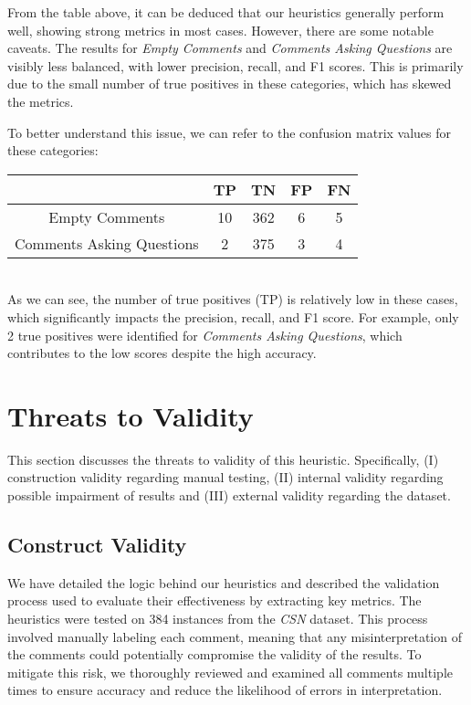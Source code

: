 \noindent From the table above, it can be deduced that our heuristics generally perform well, showing strong metrics in most cases. However, there are some notable caveats. The results for \textit{Empty Comments} and \textit{Comments Asking Questions} are visibly less balanced, with lower precision, recall, and F1 scores. This is primarily due to the small number of true positives in these categories, which has skewed the metrics.

\noindent To better understand this issue, we can refer to the confusion matrix values for these categories:
\begin{center}
	\begin{tabular}{|c|c|c|c|c|}
		\hline
		& \textbf{TP} & \textbf{TN} & \textbf{FP} & \textbf{FN} \\
		\hline Empty Comments             & 10     & 362      & 6   & 5    \\
		\hline Comments Asking Questions  & 2     & 375      & 3   & 4    \\
		\hline
	\end{tabular}
\end{center}

\noindent \\ As we can see, the number of true positives (TP) is relatively low in these cases, which significantly impacts the precision, recall, and F1 score. For example, only 2 true positives were identified for \textit{Comments Asking Questions}, which contributes to the low scores despite the high accuracy.

\section{Threats to Validity}
This section discusses the threats to validity of this heuristic. Specifically, (I) construction validity regarding manual testing, (II) internal validity regarding possible impairment of results and (III) external validity regarding the dataset.

\subsection{Construct Validity}
We have detailed the logic behind our heuristics and described the validation process used to evaluate their effectiveness by extracting key metrics. The heuristics were tested on 384 instances from the \textit{CSN} dataset. This process involved manually labeling each comment, meaning that any misinterpretation of the comments could potentially compromise the validity of the results. To mitigate this risk, we thoroughly reviewed and examined all comments multiple times to ensure accuracy and reduce the likelihood of errors in interpretation.

